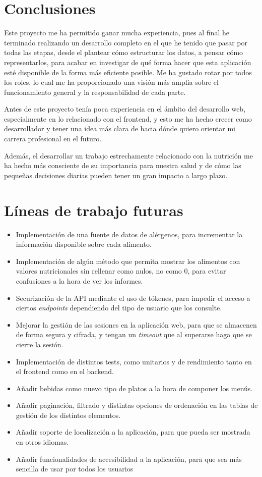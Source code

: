
\section{Conclusiones}
Este proyecto me ha permitido ganar mucha experiencia, pues al final he terminado realizando un desarrollo completo en el que he tenido que pasar por todas las etapas, desde el plantear cómo estructurar los datos, a pensar cómo representarlos, para acabar en investigar de qué forma hacer que esta aplicación esté disponible de la forma más eficiente posible. Me ha gustado rotar por todos los roles, lo cual me ha proporcionado una visión más amplia sobre el funcionamiento general y la responsabilidad de cada parte.

Antes de este proyecto tenía poca experiencia en el ámbito del desarrollo web, especialmente en lo relacionado con el frontend, y esto me ha hecho crecer como desarrollador y tener una idea más clara de hacia dónde quiero orientar mi carrera profesional en el futuro.

Además, el desarrollar un trabajo estrechamente relacionado con la nutrición me ha hecho más consciente de su importancia para nuestra salud y de cómo las pequeñas decisiones diarias pueden tener un gran impacto a largo plazo.

\section{Líneas de trabajo futuras}
\begin{itemize}
\item Implementación de una fuente de datos de alérgenos, para incrementar la información disponible sobre cada alimento.
\item Implementación de algún método que permita mostrar los alimentos con valores nutricionales sin rellenar como nulos, no como 0, para evitar confusiones a la hora de ver los informes.
\item Securización de la API mediante el uso de tókenes, para impedir el acceso a ciertos \textit{endpoints} dependiendo del tipo de usuario que los consulte.
\item Mejorar la gestión de las sesiones en la aplicación web, para que se almacenen de forma segura y cifrada, y tengan un \textit{timeout} que al superarse haga que se cierre la sesión.
\item Implementación de distintos tests, como unitarios y de rendimiento tanto en el frontend como en el backend.
\item Añadir bebidas como nuevo tipo de platos a la hora de componer los menús.
\item Añadir paginación, filtrado y distintas opciones de ordenación en las tablas de gestión de los distintos elementos.
\item Añadir soporte de localización a la aplicación, para que pueda ser mostrada en otros idiomas.
\item Añadir funcionalidades de accesibilidad a la aplicación, para que sea más sencilla de usar por todos los usuarios
\end{itemize}


